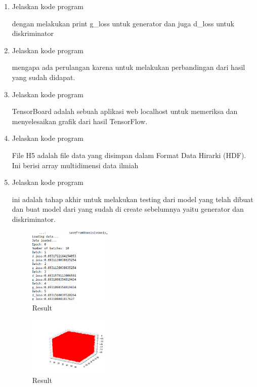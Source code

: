 \begin{enumerate}
        \item Jelaskan kode program 
        
        dengan melakukan print g\_loss untuk generator dan juga d\_loss untuk diskriminator
        
        \item Jelaskan kode program 
        
        mengapa ada perulangan karena untuk melakukan perbandingan dari hasil yang sudah didapat.
        
        \item Jelaskan kode program 
        
        TensorBoard adalah sebuah aplikasi web localhost untuk memeriksa dan menyelesaikan grafik dari hasil TensorFlow.
        
        \item Jelaskan kode program 
        
        File H5 adalah file data yang disimpan dalam Format Data Hirarki (HDF). Ini berisi array multidimensi data ilmiah
        
        \item Jelaskan kode program 
        
        ini adalah tahap akhir untuk melakukan testing dari model yang telah dibuat dan buat model dari yang sudah di create sebelumnya yaitu generator dan diskriminator.
        
        \begin{figure}[H]
            \centering
            \includegraphics[width=4cm]{figures/1174057/chapter8/27_1.PNG}
            \caption{Result}
        \end{figure}
        
        \begin{figure}[H]
            \centering
            \includegraphics[width=4cm]{figures/1174057/chapter8/27_2.PNG}
            \caption{Result} 
        \end{figure}
        

\end{enumerate}
